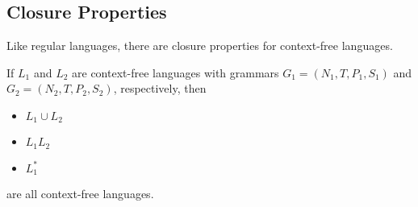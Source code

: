 \subsection{Closure Properties}\label{closure-properties-for-context-free-languages}

Like regular languages, there are closure properties for context-free languages.

\begin{theorem}
    If \(L_1\) and \(L_2\) are context-free languages with grammars \(G_1=(N_1, T, P_1, S_1)\) and \(G_2=(N_2, T, P_2, S_2)\), respectively, then

    \begin{itemize}
        \item \(L_1\cup L_2\)
        \item \(L_1 L_2\)
        \item \(L_1^*\)
    \end{itemize}

    are all context-free languages.
\end{theorem}